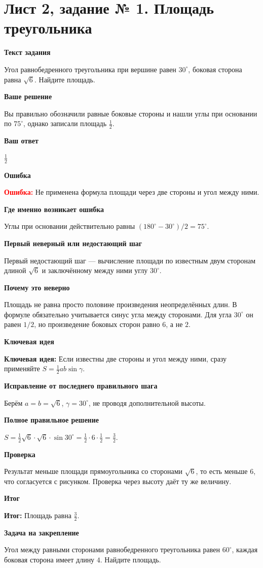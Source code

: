 \documentclass[11pt,a4paper]{article}
\newcommand{\Idea}{\textcolor{blue!60!black}{\textbf{Ключевая идея:}}}
\newcommand{\Res}{\textcolor{teal!60!black}{\textbf{Итог:}}}
\newcommand{\Heading}[2]{\par\medskip\textbf{#1}\par#2\par}
\begin{document}
\section*{Лист 2, задание № 1. Площадь треугольника}
\Heading{Текст задания}{Угол равнобедренного треугольника при вершине равен $30^\circ$, боковая сторона равна $\sqrt6$. Найдите площадь.}
\Heading{Ваше решение}{Вы правильно обозначили равные боковые стороны и нашли углы при основании по $75^\circ$, однако записали площадь $\frac12$.}
\Heading{Ваш ответ}{$\frac12$}
\Heading{Ошибка}{\textcolor{red}{\textbf{Ошибка:}} Не применена формула площади через две стороны и угол между ними.}
\Heading{Где именно возникает ошибка}{Углы при основании действительно равны $(180^\circ-30^\circ)/2=75^\circ$.}
\Heading{Первый неверный или недостающий шаг}{Первый недостающий шаг --- вычисление площади по известным двум сторонам длиной $\sqrt6$ и заключённому между ними углу $30^\circ$.}
\Heading{Почему это неверно}{Площадь не равна просто половине произведения неопределённых длин. В формуле обязательно учитывается синус угла между сторонами. Для угла $30^\circ$ он равен $1/2$, но произведение боковых сторон равно $6$, а не $2$.}
\Heading{Ключевая идея}{\Idea{} Если известны две стороны и угол между ними, сразу применяйте $S=\frac12 ab\sin\gamma$.}
\Heading{Исправление от последнего правильного шага}{Берём $a=b=\sqrt6$, $\gamma=30^\circ$, не проводя дополнительной высоты.}
\Heading{Полное правильное решение}{$S=\frac12\sqrt6\cdot\sqrt6\cdot\sin30^\circ=\frac12\cdot6\cdot\frac12=\frac32$.}
\Heading{Проверка}{Результат меньше площади прямоугольника со сторонами $\sqrt6$, то есть меньше $6$, что согласуется с рисунком. Проверка через высоту даёт ту же величину.}
\Heading{Итог}{\Res{} Площадь равна $\frac32$.}
\Heading{Задача на закрепление}{Угол между равными сторонами равнобедренного треугольника равен $60^\circ$, каждая боковая сторона имеет длину $4$. Найдите площадь.}
\newpage
{}\label{task:2_5}
\end{document}
